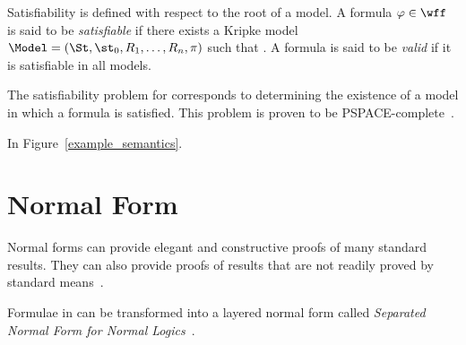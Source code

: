Satisfiability is defined with respect to the root of a model. A formula $\varphi
\in \wff$ is said to be \emph{satisfiable} if there exists a Kripke model
$\Model = (\St, \st_0, R_1, \ldots, R_n, \pi)$ such that
. A formula is said to be \emph{valid} if it is
satisfiable in all models.

The satisfiability problem for  corresponds to determining the
existence of a model in which a formula is satisfied. This problem is proven to be
PSPACE-complete~\cite{Spaan:coml}.

\begin{example}
    In Figure~\ref{example_semantics}.    
\end{example}



\section{Normal Form}

Normal forms can provide elegant and constructive proofs of many standard
results. They can also provide proofs of results that are not readily proved by
standard means~\cite{fine1975}.

Formulae in  can be transformed into a layered normal form called
\emph{Separated Normal Form for Normal Logics}~\cite{journals/jal/NalonD07}. 
